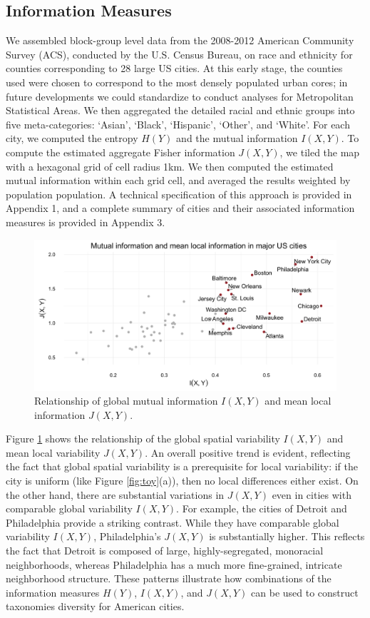 \subsection{Information Measures}

	We assembled block-group level data from the 2008-2012 American Community Survey (ACS), conducted by the U.S. Census Bureau, on race and ethnicity for counties corresponding to 28 large US cities. At this early stage, the counties used were chosen to correspond to the most densely populated urban cores; in future developments we could standardize to conduct analyses for Metropolitan Statistical Areas. We then aggregated the detailed racial and ethnic groups into five meta-categories: `Asian', `Black', `Hispanic', `Other', and `White'. For each city, we computed the entropy $H(Y)$ and the mutual information $I(X,Y)$. To compute the estimated aggregate Fisher information $J(X,Y)$, we tiled the map with a hexagonal grid of cell radius 1km. We then computed the estimated mutual information within each grid cell, and averaged the results weighted by population population. A technical specification of this approach is provided in Appendix 1, and a complete summary of cities and their associated information measures is provided in Appendix 3. 
			
		\begin{figure}
			\includegraphics[width=1\textwidth]{figs/mutual_fisher.png}
			\caption{Relationship of global mutual information $I(X,Y)$ and mean local information $J(X,Y)$.} 
			\label{fig:info_cross}
		\end{figure}	
	Figure \ref{fig:info_cross} shows the relationship of the global spatial variability $I(X,Y)$ and mean local variability $J(X,Y)$. An overall positive trend is evident, reflecting the fact that global spatial variability is a prerequisite for local variability: if the city is uniform (like Figure \ref{fig:toy}(a)), then no local differences either exist.  On the other hand, there are substantial variations in $J(X,Y)$ even in cities with comparable global variability $I(X,Y)$. For example, the cities of Detroit and Philadelphia provide a striking contrast. While they have comparable global variability $I(X,Y)$, Philadelphia's $J(X,Y)$ is substantially higher. This reflects the fact that Detroit is composed of large, highly-segregated, monoracial neighborhoods, whereas Philadelphia has a much more fine-grained, intricate neighborhood structure. These patterns illustrate how combinations of the information measures $H(Y)$, $I(X,Y)$, and $J(X,Y)$ can be used to construct taxonomies diversity for American cities. 

